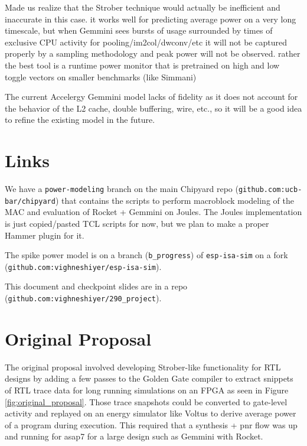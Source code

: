 \documentclass[sigconf]{acmart}
\begin{document}
Made us realize that the Strober technique would actually be inefficient and inaccurate in this case. it works well for predicting average power on a very long timescale, but when Gemmini sees bursts of usage surrounded by times of exclusive CPU activity for pooling/im2col/dwconv/etc it will not be captured properly by a sampling methodology and peak power will not be observed. rather the best tool is a runtime power monitor that is pretrained on high and low toggle vectors on smaller benchmarks (like Simmani)

The current Accelergy Gemmini model lacks of fidelity as it does not account for the behavior of the L2 cache, double buffering, wire, etc., so it will be a good idea to refine the existing model in the future.

\appendix
\section{Links}
We have a \texttt{power-modeling} branch on the main Chipyard repo (\texttt{github.com:ucb-bar/chipyard}) that contains the scripts to perform macroblock modeling of the MAC and evaluation of Rocket + Gemmini on Joules.
The Joules implementation is just copied/pasted TCL scripts for now, but we plan to make a proper Hammer plugin for it.

The spike power model is on a branch (\texttt{b\_progress}) of \texttt{esp-isa-sim} on a fork (\texttt{github.com:vighneshiyer/esp-isa-sim}).

This document and checkpoint slides are in a repo\\
(\texttt{github.com:vighneshiyer/290\_project}).


\section{Original Proposal}
The original proposal involved developing Strober\cite{strober}-like functionality for RTL designs by adding a few passes to the Golden Gate compiler to extract snippets of RTL trace data for long running simulations on an FPGA as seen in Figure \ref{fig:original_proposal}.
Those trace snapshots could be converted to gate-level activity and replayed on an energy simulator like Voltus to derive average power of a program during execution.
This required that a synthesis + pnr flow was up and running for asap7 for a large design such as Gemmini with Rocket.
\end{document}
